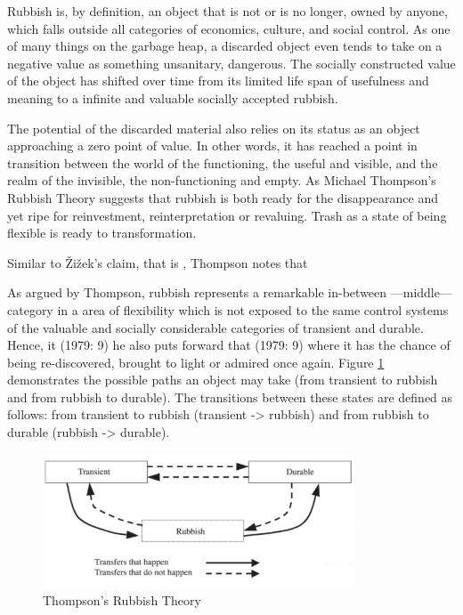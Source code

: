 Rubbish is, by definition, an object that is not or is no longer, owned by anyone, which falls outside all categories of economics, culture, and social control. As one of many things on the garbage heap, a discarded object even tends to take on a negative value as something unsanitary, dangerous. The socially constructed value of the object has shifted over time from its limited life span of usefulness and meaning to a infinite and valuable socially accepted rubbish.

The potential of the discarded material also relies on its status as an object approaching a zero point of value. In other words, it has reached a point in transition between the world of the functioning, the useful and visible, and the realm of the invisible, the non-functioning and empty. As Michael Thompson’s Rubbish Theory suggests that rubbish is both ready for the disappearance and yet ripe for reinvestment, reinterpretation or revaluing. Trash as a state of being flexible is ready to transformation.

Similar to Žižek’s claim, that is , Thompson notes that 

As argued by Thompson, rubbish represents a remarkable in-between ---middle--- category in a area of flexibility which is not exposed to the same control systems of the valuable and socially considerable categories of transient and durable. Hence, it  (1979: 9) he also puts forward that  (1979: 9) where it has the chance of being re-discovered, brought to light or admired once again. Figure \ref{fig:rubbish_theory} demonstrates the possible paths an object may take (from transient to rubbish and from rubbish to durable). The transitions between these states are defined as follows: from transient to rubbish (transient -> rubbish) and from rubbish to durable (rubbish -> durable).

\begin{figure}[h!]
  \centering
  \includegraphics[height=4cm]{graphics/rubbish_theory.jpg}
  \caption{Thompson’s Rubbish Theory}
  \label{fig:rubbish_theory}
\end{figure}

